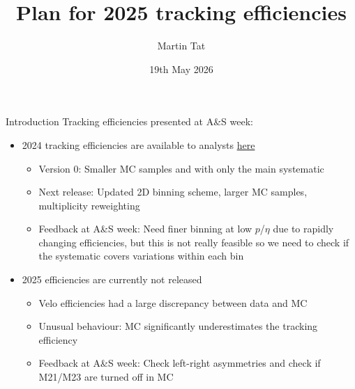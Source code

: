 \documentclass[xcolor={dvipsnames}]{beamer}
\title[Heidelberg tracking meeting]{Plan for 2025 tracking efficiencies}
\author[Martin Tat]{Martin Tat}
\institute[Heidelberg]{Heidelberg University}
\date{19th May 2026}
\begin{document}
\begin{frame}
  \titlepage
\end{frame}


\begin{frame}{Introduction}
  \vspace{0.0cm}
  {\Large Tracking efficiencies presented at A\&S week:}
  \vspace{0.2cm}
  \begin{itemize}
    \setlength\itemsep{1.0em}
    \item{2024 tracking efficiencies are available to analysts \href{https://gitlab.cern.ch/lhcb-rta/tracking-efficiencies-run-3}{here}}
    \begin{itemize}
      \item[-]{Version 0: Smaller MC samples and with only the main systematic}
      \item[-]{Next release: Updated 2D binning scheme, larger MC samples, multiplicity reweighting}
      \item[-]{Feedback at A\&S week: Need finer binning at low $p$/$\eta$ due to rapidly changing efficiencies, but this is not really feasible so we need to check if the systematic covers variations within each bin}
    \end{itemize}
    \item{2025 efficiencies are currently not released}
    \begin{itemize}
      \item[-]{Velo efficiencies had a large discrepancy between data and MC}
      \item[-]{Unusual behaviour: MC significantly underestimates the tracking efficiency}
      \item[-]{Feedback at A\&S week: Check left-right asymmetries and check if M21/M23 are turned off in MC}
    \end{itemize}
  \end{itemize}
\end{frame}
\end{document}
